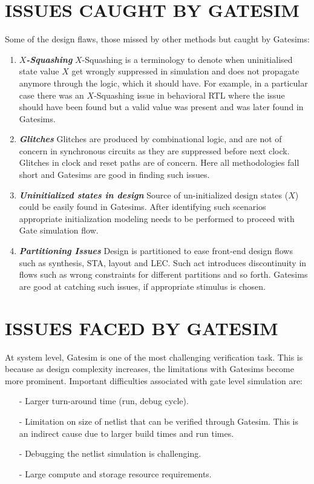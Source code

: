 \section{ISSUES CAUGHT BY GATESIM}
Some of the design flaws, those missed by other methods but caught by Gatesims:
\begin{enumerate}

\item \emph{\bf $X$-Squashing}
	$X$-Squashing is a terminology to denote when uninitialised state value $X$ get wrongly suppressed in simulation and does not propagate anymore through the logic, which it should have. For example, in a particular case there was an $X$-Squashing issue in behavioral RTL where the issue should have been found but a valid value was present and was later found in Gatesims.

\item \emph{\bf Glitches}
	Glitches are produced by combinational logic, and are not of concern in synchronous circuits as they are suppressed before next clock. Glitches in clock and reset paths are of concern. Here all methodologies fall short and Gatesims are good in finding such issues.

\item \emph{\bf Uninitialized states in design}
	Source of un-initialized design states ($X$) could be easily found in Gatesims. After identifying such scenarios appropriate initialization modeling needs to be performed to proceed with Gate simulation flow.

\item \emph{\bf Partitioning Issues}
	Design is partitioned to ease front-end design flows such as synthesis, STA, layout and LEC. Such act introduces discontinuity in flows such as wrong constraints for different partitions and so forth. Gatesims are good at catching such issues, if appropriate stimulus is chosen.

\end{enumerate}


\section{ISSUES FACED BY GATESIM}
\label{intro:sec:ifg}
At system level, Gatesim is one of the most challenging verification task. This is because as design complexity increases, the limitations with Gatesims become more prominent. Important difficulties associated with gate level simulation are:
\begin{itemize}


\item[-] Larger turn-around time (run, debug cycle).
\item[-] Limitation on size of netlist that can be verified through Gatesim. This is an indirect cause due to larger build times and run times.
\item[-] Debugging the netlist simulation is challenging.
\item[-] Large compute and storage resource requirements. 

\end{itemize}

